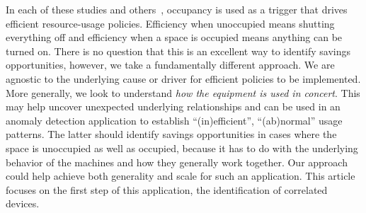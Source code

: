 
In each of these studies and others~\cite{AgarwalBDGW11, kaminthermo, buildanomaly}, occupancy is used as a trigger
that drives efficient resource-usage policies.  Efficiency
when unoccupied means shutting everything off and efficiency when a space is occupied means anything
can be turned on.  There is no question that this is an excellent way to identify savings opportunities, however, we
take a fundamentally different approach.  We are agnostic to the underlying cause or driver for efficient
policies to be implemented.  More generally, we look to understand \emph{how the equipment is used in
concert}.  This may help uncover unexpected underlying relationships and can be used in an anomaly detection application
to establish ``(in)efficient'', ``(ab)normal'' usage patterns.  The latter 
should identify savings opportunities in cases where the space is unoccupied as well 
as occupied, because it has to do with the underlying behavior of the machines and how they generally work
together.  Our approach could help achieve both generality and scale for such an application.
This article focuses on the first step of this application, the identification of correlated devices.




